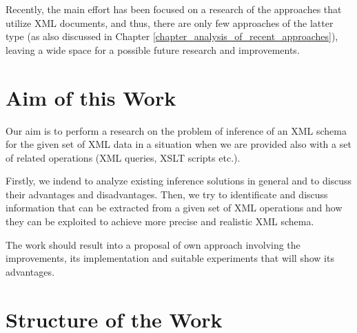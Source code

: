 Recently, the main effort has been focused on a research of the approaches that utilize XML documents, and thus, there are only few approaches of the latter type (as also discussed in Chapter \ref{chapter_analysis_of_recent_approaches}), leaving a wide space for a possible future research and improvements.

\section{Aim of this Work}
Our aim is to perform a research on the problem of inference of an XML schema for the given set of XML data in a situation when we are provided also with a set of related operations (XML queries, XSLT scripts \cite{Clark:99:XTV} etc.).

Firstly, we indend to analyze existing inference solutions in general and to discuss their advantages and disadvantages. Then, we try to identificate and discuss information that can be extracted from a given set of XML operations and how they can be exploited to achieve more precise and realistic XML schema.

The work should result into a proposal of own approach involving the improvements, its implementation and suitable experiments that will show its advantages.

\section{Structure of the Work}
